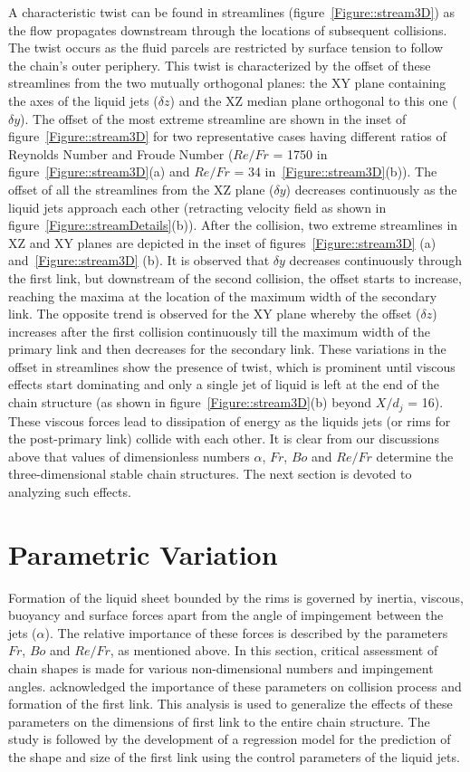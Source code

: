 A characteristic twist can be found in streamlines (figure~\ref{Figure::stream3D}) as the flow propagates downstream through the locations of subsequent collisions. The twist occurs as the fluid parcels are restricted by surface tension to follow the chain's outer periphery. This twist is characterized by the offset of these streamlines from the two mutually orthogonal planes: the XY plane containing the axes of the liquid jets ($\delta z$) and the XZ median plane orthogonal to this one ($\delta y$). The offset of the most extreme streamline are shown in the inset of figure~\ref{Figure::stream3D} for two representative cases having different ratios of Reynolds Number and Froude Number ($Re/Fr$ = 1750 in figure~\ref{Figure::stream3D}(a) and $Re/Fr$ = 34 in~\ref{Figure::stream3D}(b)). The offset of all the streamlines from the XZ plane ($\delta y$) decreases continuously as the liquid jets approach each other (retracting velocity field as shown in figure~\ref{Figure::streamDetails}(b)). After the collision, two extreme streamlines in XZ and XY planes are depicted in the inset of figures~\ref{Figure::stream3D} (a) and~\ref{Figure::stream3D} (b). It is observed that $\delta y$ decreases continuously through the first link, but downstream of the second collision, the offset starts to increase, reaching the maxima at the location of the maximum width of the secondary link. The opposite trend is observed for the XY plane whereby the offset ($\delta z$) increases after the first collision continuously till the maximum width of the primary link and then decreases for the secondary link. These variations in the offset in streamlines show the presence of twist, which is prominent until viscous effects start dominating and only a single jet of liquid is left at the end of the chain structure (as shown in figure~\ref{Figure::stream3D}(b) beyond $X/d_j$ = 16). These viscous forces lead to dissipation of energy as the liquids jets (or rims for the post-primary link) collide with each other. It is clear from our discussions above that values of dimensionless numbers $\alpha$, $Fr$, $Bo$ and $Re/Fr$ determine the three-dimensional stable chain structures. The next section is devoted to analyzing such effects.
\section{Parametric Variation}
Formation of the liquid sheet bounded by the rims is governed by inertia, viscous, buoyancy and surface forces apart from the angle of impingement between the jets ($\alpha$). The relative importance of these forces is described by the parameters $Fr$, $Bo$ and $Re/Fr$, as mentioned above. In this section, critical assessment of chain shapes is made for various non-dimensional numbers and impingement angles.  \cite{yang2014liquid} acknowledged the importance of these parameters on collision process and formation of the first link. This analysis is used to generalize the effects of these parameters on the dimensions of first link to the entire chain structure. The study is followed by the development of a regression model for the prediction of the shape and size of the first link using the control parameters of the liquid jets. 

